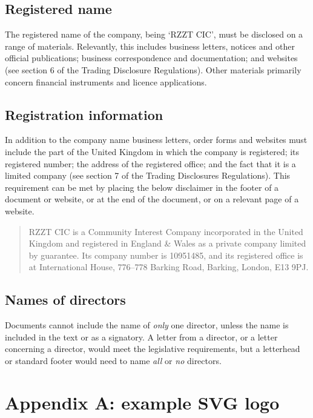 \documentclass[a4paper,10pt]{article}
\begin{document}
\subsection{Registered name}

The registered name of the company, being `RZZT CIC', must be disclosed on a range of materials. Relevantly, this includes business letters, notices and other official publications; business correspondence and documentation; and websites (see section 6 of the Trading Disclosure Regulations). Other materials primarily concern financial instruments and licence applications.

\subsection{Registration information}

In addition to the company name business letters, order forms and websites must include the part of the United Kingdom in which the company is registered; its registered number; the address of the registered office; and the fact that it is a limited company (see section 7 of the Trading Disclosures Regulations). This requirement can be met by placing the below disclaimer in the footer of a document or website, or at the end of the document, or on a relevant page of a website.

\begin{quote}
  RZZT CIC is a Community Interest Company incorporated in the United Kingdom and registered in England \& Wales as a private company limited by guarantee. Its company number is 10951485, and its registered office is at International House, 776–778 Barking Road, Barking, London, E13 9PJ.
\end{quote}

\subsection{Names of directors}

Documents cannot include the name of \textit{only} one director, unless the name is included in the text or as a signatory. A letter from a director, or a letter concerning a director, would meet the legislative requirements, but a letterhead or standard footer would need to name \textit{all} or \textit{no} directors.

\newpage

\section{Appendix A: example SVG logo}
\end{document}
